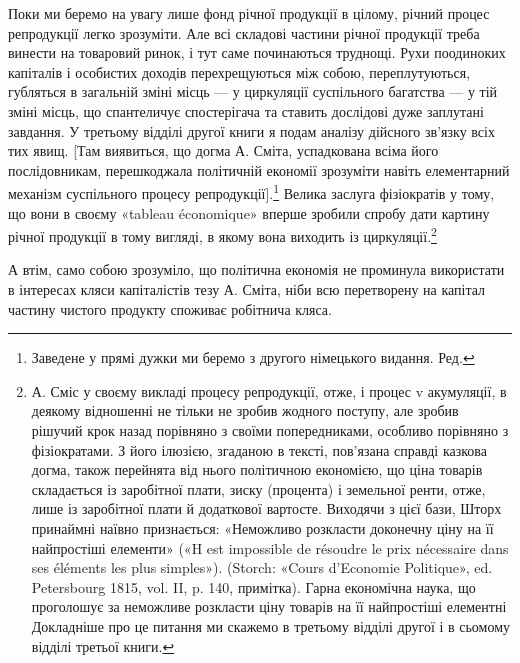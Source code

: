 Поки ми беремо на увагу лише фонд річної продукції в цілому,
річний процес репродукції легко зрозуміти. Але всі складові
частини річної продукції треба винести на товаровий ринок, і
тут саме починаються труднощі. Рухи поодиноких капіталів і
особистих доходів перехрещуються між собою, переплутуються,
губляться в загальній зміні місць — у циркуляції суспільного
багатства — у тій зміні місць, що спантеличує спостерігача та
ставить дослідові дуже заплутані завдання. У третьому відділі
другої книги я подам аналізу дійсного зв’язку всіх тих явищ.
[Там виявиться, що догма А. Сміта, успадкована всіма його послідовникам,
перешкоджала політичній економії зрозуміти навіть
елементарний механізм суспільного процесу репродукції].\footnote*{
Заведене у прямі дужки ми беремо з другого німецького видання.
Ред.
} Велика
заслуга фізіократів у тому, що вони в своєму «tableau économique»
вперше зробили спробу дати картину річної продукції
в тому вигляді, в якому вона виходить із циркуляції.\footnote{
А. Сміс у своєму викладі процесу репродукції, отже, і процес v
акумуляції, в деякому відношенні не тільки не зробив жодного поступу,
але зробив рішучий крок назад порівняно з своїми попередниками, особливо
порівняно з фізіократами. З його ілюзією, згаданою в тексті, пов’язана
справді казкова догма, також перейнята від нього політичною економією,
що ціна товарів складається із заробітної плати, зиску (процента)
і земельної ренти, отже, лише із заробітної плати й додаткової вартосте.
Виходячи з цієї бази, Шторх принаймні наївно признається: «Неможливо
розкласти доконечну ціну на її найпростіші елементи» («H est
impossible de résoudre le prix nécessaire dans ses éléments les plus simples»).
(Storch: «Cours d’Economie Politique», ed. Petersbourg 1815,
vol. II, p. 140, примітка). Гарна економічна наука, що проголошує за
неможливе розкласти ціну товарів на її найпростіші елементні Докладніше
про це питання ми скажемо в третьому відділі другої і в сьомому
відділі третьої книги.
}

А втім, само собою зрозуміло, що політична економія не проминула
використати в інтересах кляси капіталістів тезу А. Сміта,
ніби всю перетворену на капітал частину чистого продукту споживає
робітнича кляса.
